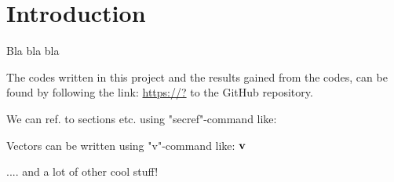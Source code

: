 \chapter{Introduction}

Bla bla bla

The codes written in this project and the results gained from the codes, can be found by following the link: \url{https://?} to the GitHub repository. 

We can ref. to sections etc. using "secref"-command like: 

Vectors can be written using "v"-command like: $\mbox{\textbf{v}}$

.... and a lot of other cool stuff!

